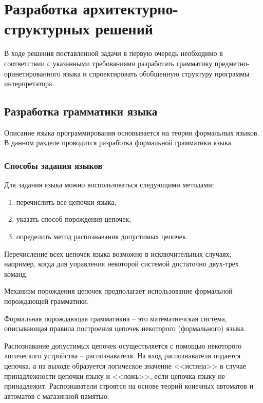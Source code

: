\newpage

\section{Разработка архитектурно-структурных решений}

В ходе решения поставленной задачи в первую очередь необходимо в соответствии с указанными требованиями
разработать грамматику предметно-оринетированного языка и спроектировать обобщенную структуру программы интерпретатора.


\subsection{Разработка грамматики языка}

Описание языка программирования основывается на теории формальных языков.
В данном разделе проводится разработка формальной грамматики языка.


\subsubsection{Способы задания языков}

Для задания языка можно воспользоваться следующими методами:

\begin{enumerate}
    \item перечислить все цепочки языка;
    \item указать способ порождения цепочек;
    \item определить метод распознавания допустимых цепочек.
\end{enumerate}

Перечисление всех цепочек языка возможно в исключительных случаях, например,
когда для управления некоторой системой достаточно двух-трех команд.

Механизм порождения цепочек предполагает использование формальной порождающей грамматики.

Формальная порождающая грамматикиа -- это математиечская система, описывающая правила построения цепочек некоторого (формального) языка.

Распознавание допустимых цепочек осуществляется с помощью некоторого логического устройства -- распознавателя.
На вход распознавателя подается цепочка, а на выходе образуется логическое значение <<истина>> в случае принадлежности цепочки языку
и <<ложь>>, если цепочка языку не принадлежит.
Распознаватели строятся на основе теорий конечных автоматов и автоматов с магазинной памятью.

